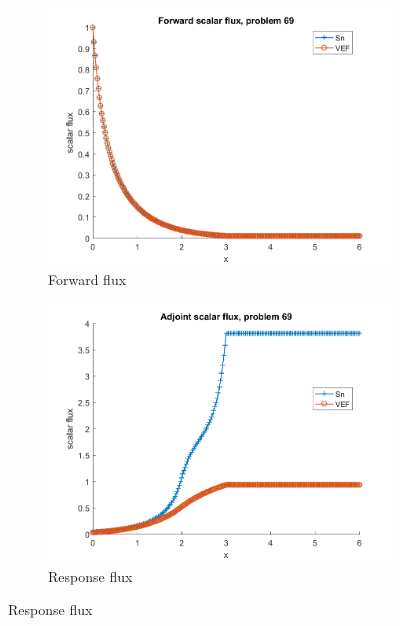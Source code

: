 \documentclass{article}
\begin{document}
\begin{figure}[H]
\label{Case69Flux}
\centering
\begin{subfigure}{.5\textwidth}
  \centering
  \includegraphics[width=.98\linewidth]{IanProposal/figures2/69phi.png}
  \caption{Forward flux}
  \label{fig:sfig1}
\end{subfigure}%
\begin{subfigure}{.5\textwidth}
  \centering
  \includegraphics[width=.98\linewidth]{IanProposal/figures2/69phia.png}
  \caption{Response flux}
  \label{fig:sfig4}
\end{subfigure}%
\end{figure}
\end{document}
